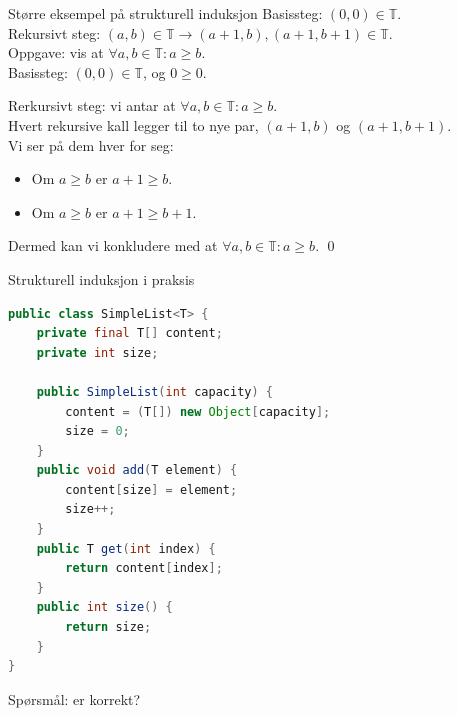 \begin{frame}{Større eksempel på strukturell induksjon}
    Basissteg: $(0, 0) \in \mathbb{T}$.\\
    Rekursivt steg: $(a, b) \in \mathbb{T} \rightarrow (a+1, b), (a+1, b+1) \in \mathbb{T}$.\\
    
    Oppgave: vis at $\forall a, b \in \mathbb{T} : a \geq b$.\\
    
    \pause
    Basissteg: $(0, 0) \in \mathbb{T}$, og $0 \geq 0$. \checkmark\\
    \pause

    Rerkursivt steg: vi antar at $\forall a, b \in \mathbb{T} : a \geq b$.\\
    \pause
    Hvert rekursive kall legger til to nye par, $(a+1, b)$ og $(a+1, b+1)$.\\
    \pause
    Vi ser på dem hver for seg:
    \begin{itemize}
        \item Om $a \geq b$ er $a+1 \geq b$.
        \item Om $a \geq b$ er $a+1 \geq b+1$. \checkmark
    \end{itemize}
    \pause
    Dermed kan vi konkludere med at $\forall a, b \in \mathbb{T} : a \geq b$. \qed
\end{frame}

\begin{frame}[fragile]{Strukturell induksjon i praksis}
    \begin{lstlisting}[language=Java]
public class SimpleList<T> {
    private final T[] content;
    private int size;

    public SimpleList(int capacity) {
        content = (T[]) new Object[capacity];
        size = 0;
    }
    public void add(T element) {
        content[size] = element;
        size++;
    }
    public T get(int index) { 
        return content[index]; 
    }
    public int size() { 
        return size; 
    }
}
    \end{lstlisting}

    \pause
    Spørsmål: er  korrekt?
\end{frame}
